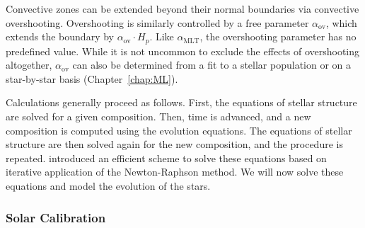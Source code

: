 \begin{description}
    Convective zones can be extended beyond their normal boundaries via convective overshooting. 
    Overshooting is similarly controlled by a free parameter $\alpha_{\text{ov}}$, which extends the boundary by ${\alpha_{\text{ov}} \cdot H_p}$. 
    Like $\alpha_{\text{MLT}}$, the overshooting parameter has no predefined value. 
    While it is not uncommon to exclude the effects of overshooting altogether, $\alpha_{\text{ov}}$ can also be determined from a fit to a stellar population \citep[e.g.,][]{2005ARA&A..43..387G} or on a star-by-star basis (Chapter~\ref{chap:ML}). 
\end{description}

\noindent Calculations generally proceed as follows. 
First, the equations of stellar structure are solved for a given composition. 
Then, time is advanced, and a new composition is computed using the evolution equations. 
The equations of stellar structure are then solved again for the new composition, and the procedure is repeated. 
\citet{1959ApJ...129..628H} introduced an efficient scheme to solve these equations based on iterative application of the Newton-Raphson method. 
We will now solve these equations and model the evolution of the stars. %


\subsubsection*{Solar Calibration}
\label{sec:calibration}

